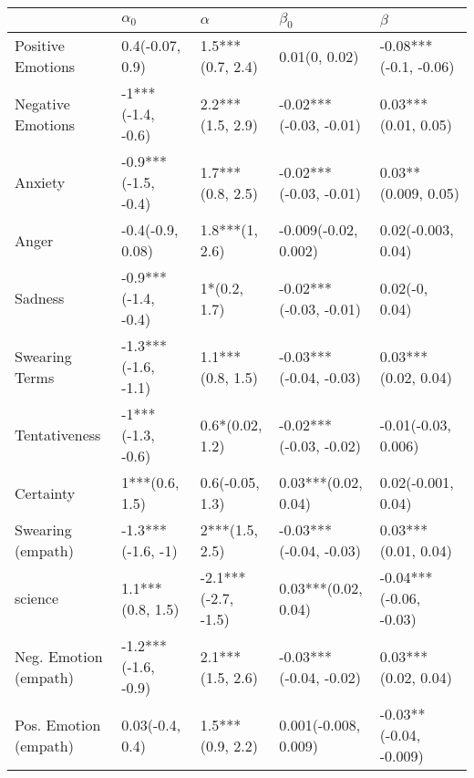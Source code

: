 \begin{tabular}{lllll}
\toprule
{} &           $\alpha_0$ &             $\alpha$ &               $\beta_0$ &                 $\beta$ \\
\midrule
Positive Emotions     &      0.4(-0.07, 0.9) &     1.5***(0.7, 2.4) &           0.01(0, 0.02) &   -0.08***(-0.1, -0.06) \\
Negative Emotions     &    -1***(-1.4, -0.6) &     2.2***(1.5, 2.9) &  -0.02***(-0.03, -0.01) &     0.03***(0.01, 0.05) \\
Anxiety               &  -0.9***(-1.5, -0.4) &     1.7***(0.8, 2.5) &  -0.02***(-0.03, -0.01) &     0.03**(0.009, 0.05) \\
Anger                 &     -0.4(-0.9, 0.08) &       1.8***(1, 2.6) &    -0.009(-0.02, 0.002) &      0.02(-0.003, 0.04) \\
Sadness               &  -0.9***(-1.4, -0.4) &         1*(0.2, 1.7) &  -0.02***(-0.03, -0.01) &          0.02(-0, 0.04) \\
Swearing Terms        &  -1.3***(-1.6, -1.1) &     1.1***(0.8, 1.5) &  -0.03***(-0.04, -0.03) &     0.03***(0.02, 0.04) \\
Tentativeness         &    -1***(-1.3, -0.6) &      0.6*(0.02, 1.2) &  -0.02***(-0.03, -0.02) &     -0.01(-0.03, 0.006) \\
Certainty             &       1***(0.6, 1.5) &      0.6(-0.05, 1.3) &     0.03***(0.02, 0.04) &      0.02(-0.001, 0.04) \\
Swearing (empath)     &    -1.3***(-1.6, -1) &       2***(1.5, 2.5) &  -0.03***(-0.04, -0.03) &     0.03***(0.01, 0.04) \\
science               &     1.1***(0.8, 1.5) &  -2.1***(-2.7, -1.5) &     0.03***(0.02, 0.04) &  -0.04***(-0.06, -0.03) \\
Neg. Emotion (empath) &  -1.2***(-1.6, -0.9) &     2.1***(1.5, 2.6) &  -0.03***(-0.04, -0.02) &     0.03***(0.02, 0.04) \\
Pos. Emotion (empath) &      0.03(-0.4, 0.4) &     1.5***(0.9, 2.2) &    0.001(-0.008, 0.009) &  -0.03**(-0.04, -0.009) \\
\bottomrule
\end{tabular}
